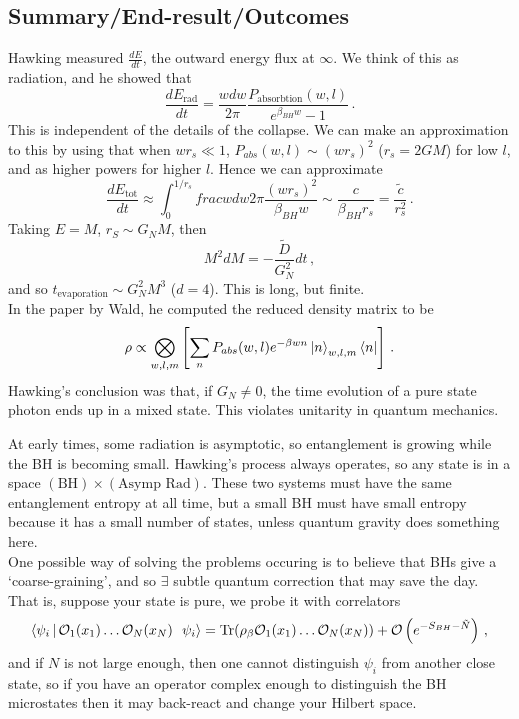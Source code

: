 \documentclass{article}
\begin{document}
\subsection{Summary/End-result/Outcomes}
Hawking measured $\frac{dE}{dt}$, the outward energy flux at $\infty$. We think of this as radiation, and he showed that 
\[
\frac{dE_{\text{rad}}}{dt} = \frac{w dw}{2 \pi} \frac{P_{\text{absorbtion}}(w, l)}{e^{\beta_{BH}w}-1} \, .
\]
This is independent of the details of the collapse. We can make an approximation to this by using that when $wr_s \ll 1$, $P_{abs}(w,l) \sim (wr_s)^2$ ($r_s = 2GM$) for low $l$, and as higher powers for higher $l$. Hence we can approximate 
\[
\frac{dE_{\text{tot}}}{dt} \approx \int_{0}^{1/r_s} frac{w dw}{2\pi} \frac{(w r_s)^2}{\beta_{BH} w} \sim \frac{c}{\beta_{BH} r_s} = \frac{\tilde{c}}{r_s^2} \, .
\]
Taking $E=M$, $r_S \sim G_N M$, then 
\[
M^2 dM = - \frac{\tilde{D}}{G_N^2} dt \, ,
\]
and so $t_{\text{evaporation}} \sim G_N^2 M^3$ ($d=4$). This is long, but finite. \\
In the paper by Wald, he computed the reduced density matrix to be 
\[
\rho \propto \bigotimes_{w,l,m} \left[ \sum_n P_{abs}(w,l) e^{-\beta w n}\ket{n}_{w,l,m}\bra{n} \right] \, .
\] 
Hawking's conclusion was that, if $G_N \neq 0$, the time evolution of a pure state photon ends up in a mixed state. This violates unitarity in quantum mechanics. 
\begin{remark}
	At early times, some radiation is asymptotic, so entanglement is growing while the BH is becoming small. Hawking's process always operates, so any state is in a space $(\text{BH}) \times (\text{Asymp Rad})$. These two systems must have the same entanglement entropy at all time, but a small BH must have small entropy because it has a small number of states, unless quantum gravity does something here. \\
	One possible way of solving the problems occuring is to believe that BHs give a `coarse-graining', and so $\exists$ subtle quantum correction that may save the day. That is, suppose your state is pure, we probe it with correlators 
	\[
	\left\langle \psi_i \, | \, \mathcal{O}_1(x_1) \dots \mathcal{O}_N(x_N) \, \ \, \psi_i \right\rangle = \operatorname{Tr}(\rho_\beta \mathcal{O}_1(x_1) \dots \mathcal{O}_N(x_N)) + \mathcal{O}\left( e^{-S_{BH} - \tilde{N}} \right) \, ,
	\]
	and if $N$ is not large enough, then one cannot distinguish $\psi_i$ from another close state, so if you have an operator complex enough to distinguish the BH microstates then it may back-react and change your Hilbert space.  
	
\end{remark}
\end{document}
